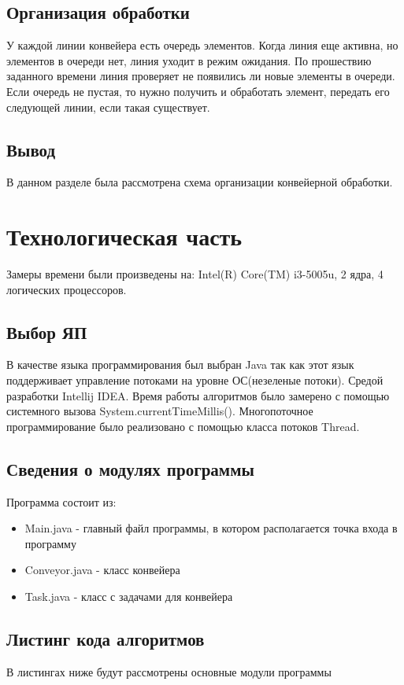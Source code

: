 \documentclass[12pt]{report}
\begin{document}
\section{Организация обработки}
У каждой линии конвейера есть очередь элементов. Когда линия еще активна, но элементов в очереди нет, линия уходит в режим ожидания.
По прошествию заданного времени линия проверяет не появились ли новые элементы в очереди. Если очередь не пустая, то нужно получить и обработать элемент, передать его следующей линии, если такая существует.

\section{Вывод}
В данном разделе была рассмотрена схема организации конвейерной обработки.

 

\chapter{Технологическая часть}
Замеры времени были произведены на: Intel(R) Core(TM) i3-5005u, 2 ядра, 4 логических процессоров.

\section{Выбор ЯП}
В качестве языка программирования был выбран Java \cite{Oracle} так как этот
язык поддерживает управление потоками на уровне ОС(незеленые потоки). Средой разработки Intellij IDEA. 
Время работы алгоритмов было замерено с помощью системного вызова System.currentTimeMillis(). Многопоточное программирование было
реализовано с помощью класса потоков Thread.

\section{Сведения о модулях программы}
Программа состоит из:
\begin{itemize}
	\item Main.java - главный файл программы, в котором располагается точка входа в программу
	\item Conveyor.java - класс конвейера
	\item Task.java - класс с задачами для конвейера
\end{itemize}


\section{Листинг кода алгоритмов}
В листингах ниже будут рассмотрены основные модули программы
\end{document}
